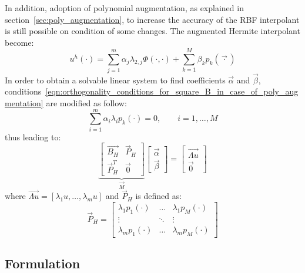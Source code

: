 \smallskip
In addition, adoption of polynomial augmentation, as explained in section~\ref{sec:poly_augmentation}, to increase the accuracy of the RBF interpolant is still possible on condition of some changes. The augmented Hermite interpolant become:
\begin{equation}
	\label{eqn:Hermite_interpolant_plus_polynomial_augmentation}
	u^h(\cdot) = \sum_{j=1}^{m} \alpha_j \lambda_{2,j} \Phi(\cdot,\cdot) + \sum_{k=1}^{M} \beta_k p_k(\vec{\cdot})
\end{equation}
In order to obtain a solvable linear system to find coefficients $\vec{\alpha}$ and $\vec{\beta}$, conditions~\eqref{eqn:orthogonality_conditions_for_square_B_in_case_of_poly_augmentation} are modified as follow:
\begin{equation}
	\label{eqn:orthogonality_conditions_HRBF}
	\sum_{i=1}^{m} \alpha_i \lambda_i p_k(\cdot) = 0, \qquad i=1, \dots, M
\end{equation}
thus leading to:
\begin{equation}
\underbrace{
\begin{bmatrix}
	\vec{B_H}  	 &  \vec{P}_H  \\
	\vec{P}_H^T  &  \vec{0}
\end{bmatrix}}_{\vec{M}}
\begin{bmatrix}
	\vec{\alpha}  \\
	\vec{\beta}
\end{bmatrix} = 
\begin{bmatrix}
	\vec{\Lambda u}  \\
	\vec{0}
\end{bmatrix}
\end{equation}
where $\vec{\Lambda u} = [\lambda_1 u, \dots, \lambda_m u]$ and $\vec{P}_H$ is defined as:
\begin{equation}
\vec{P}_H = 
\begin{bmatrix}
	\lambda_1 p_1(\cdot)  &  \dots  & \lambda_1 p_M(\cdot)  \\
	\vdots				  & \ddots  & \vdots				\\
	\lambda_m p_1(\cdot)  &  \dots  & \lambda_m p_M(\cdot)
\end{bmatrix}
\end{equation}


\subsection{Formulation}


